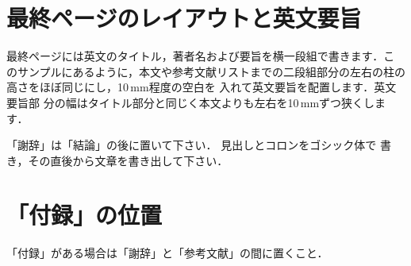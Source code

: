 \documentclass[dvipdfmx]{jsce}
\begin{document}
\lastpagecontrol[1cm]{13cm}

\section{最終ページのレイアウトと英文要旨}

最終ページには英文のタイトル，著者名および要旨を横一段組で書きます．こ
のサンプルにあるように，本文や参考文献リストまでの二段組部分の左右の柱の
高さをほぼ同じにし，10\,mm程度の空白を
入れて英文要旨を配置します．英文要旨部
分の幅はタイトル部分と同じく本文よりも左右を10\,mmずつ狭くします．

\ack 「謝辞」は「結論」の後に置いて下さい．
見出しとコロンをゴシック体で
書き，その直後から文章を書き出して下さい．

\appendix

\section{「付録」の位置}

「付録」がある場合は「謝辞」と「参考文献」の間に置くこと．




\lastpagesettings
\end{document}
